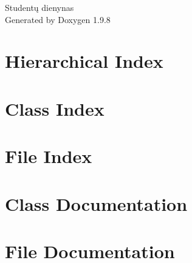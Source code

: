 \documentclass[twoside]{book}
\newcommand{\+}{\discretionary{\mbox{\scriptsize$\hookleftarrow$}}{}{}}
\newcommand{\clearemptydoublepage}{%
    \newpage{\pagestyle{empty}\cleardoublepage}%
  }
\begin{document}
  \raggedbottom
    \hypersetup{pageanchor=false,
                bookmarksnumbered=true,
                pdfencoding=unicode
               }
  \begin{titlepage}
  \vspace*{7cm}
  \begin{center}%
  {\Large Studentų dienynas}\\
  \vspace*{1cm}
  {\large Generated by Doxygen 1.9.8}\\
  \end{center}
  \end{titlepage}
  \clearemptydoublepage
  \tableofcontents
  \clearemptydoublepage
  \hypersetup{pageanchor=true}
\chapter{Hierarchical Index}

\chapter{Class Index}

\chapter{File Index}

\chapter{Class Documentation}


\chapter{File Documentation}







  \backmatter
  \newpage
  \clearemptydoublepage
  \printindex
\end{document}
